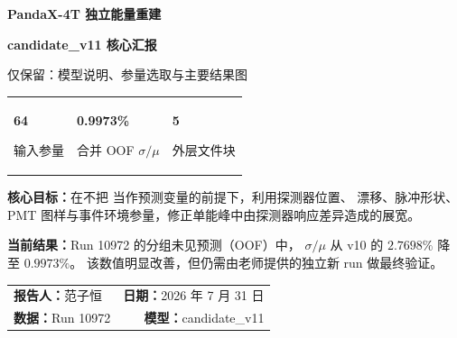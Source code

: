 \documentclass[UTF8,11pt,a4paper,fontset=none]{ctexart}
\newcommand{\var}[1]{\texttt{\detokenize{#1}}}
\begin{document}
\begin{titlepage}
\thispagestyle{empty}
\vspace*{1.0cm}
\noindent{\color{PandaTeal}\rule{\textwidth}{4pt}}
\vspace{1.2cm}

{\sffamily\bfseries\fontsize{27pt}{36pt}\selectfont\color{DeepBlue}
PandaX-4T 独立能量重建\par}
\vspace{0.25cm}
{\sffamily\bfseries\fontsize{20pt}{28pt}\selectfont\color{PandaTeal}
candidate\_v11 核心汇报\par}
\vspace{0.8cm}
{\large 仅保留：模型说明、参量选取与主要结果图}

\vspace{1.15cm}
\begin{center}
\begin{tabular}{C{4.7cm} C{4.7cm} C{4.7cm}}
\begin{tcolorbox}[width=4.45cm,colback=white,colframe=LineGray,halign=center]
{\sffamily\bfseries\fontsize{22pt}{25pt}\selectfont\color{DeepBlue}64}\par
\small 输入参量
\end{tcolorbox}
&
\begin{tcolorbox}[width=4.45cm,colback=white,colframe=LineGray,halign=center]
{\sffamily\bfseries\fontsize{22pt}{25pt}\selectfont\color{PandaTeal}0.9973\%}\par
\small 合并 OOF \(\sigma/\mu\)
\end{tcolorbox}
&
\begin{tcolorbox}[width=4.45cm,colback=white,colframe=LineGray,halign=center]
{\sffamily\bfseries\fontsize{22pt}{25pt}\selectfont\color{WarmGold}5}\par
\small 外层文件块
\end{tcolorbox}
\end{tabular}
\end{center}

\vspace{0.7cm}
\begin{keybox}
\textbf{核心目标：}在不把 \var{fileNumber} 当作预测变量的前提下，利用探测器位置、
漂移、脉冲形状、PMT 图样与事件环境参量，修正单能峰中由探测器响应差异造成的展宽。
\end{keybox}

\vspace{0.45cm}
\begin{resultbox}
\textbf{当前结果：}Run 10972 的分组未见预测（OOF）中，
\(\sigma/\mu\) 从 v10 的 \(2.7698\%\) 降至 \(0.9973\%\)。
该数值明显改善，但仍需由老师提供的独立新 run 做最终验证。
\end{resultbox}

\vfill
\noindent\begin{tabularx}{\textwidth}{@{}Y r@{}}
\textbf{报告人：}范子恒 & \textbf{日期：}2026 年 7 月 31 日\\
\textbf{数据：}Run 10972 & \textbf{模型：}candidate\_v11
\end{tabularx}
\end{titlepage}
\end{document}
